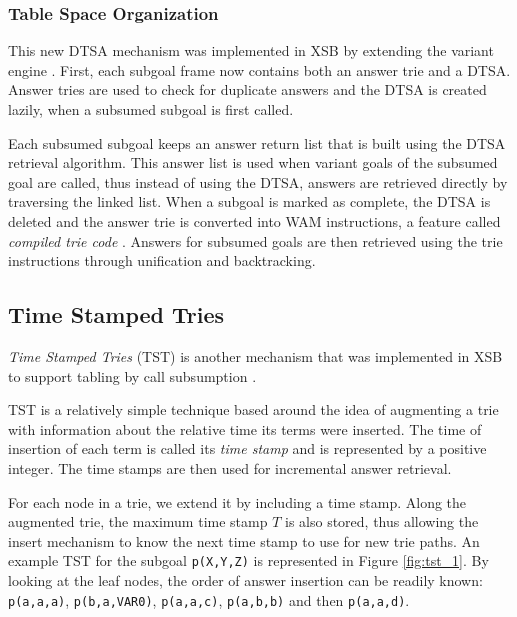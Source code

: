 \subsubsection{Table Space Organization}

This new DTSA mechanism was implemented in XSB by extending the variant engine \cite{Rao-96}.
First, each subgoal frame now contains both an answer trie and a DTSA.
Answer tries are used to check for duplicate answers and the DTSA is created lazily, when a
subsumed subgoal is first called.

Each subsumed subgoal keeps an answer return list that is built using the DTSA retrieval algorithm.
This answer list is used when variant goals of the subsumed goal are called, thus instead of using
the DTSA, answers are retrieved directly by traversing the linked list.
When a subgoal is marked as complete, the DTSA is deleted and the answer trie is converted into WAM
instructions, a feature called \textit{compiled trie code} \cite{RamakrishnanIV-99}. Answers for
subsumed goals are then retrieved using the trie instructions through unification and backtracking.

\subsection{Time Stamped Tries} \label{sec:time_stamped_tries}

\textit{Time Stamped Tries} (TST) is another mechanism that was implemented in XSB
to support tabling by call subsumption \cite{Johnson-99}.

TST is a relatively simple technique based around the idea of augmenting a trie with information about the relative time
its terms were inserted. The time of insertion of each term is called its \textit{time stamp} and is represented by a
positive integer. The time stamps are then used for incremental answer retrieval.

For each node in a trie, we extend it by including a time stamp. Along the augmented trie, the maximum time stamp
$T$ is also stored, thus allowing the insert mechanism to know the next time stamp to use for new trie paths.
An example TST for the subgoal \texttt{p(X,Y,Z)} is represented in Figure \ref{fig:tst_1}.
By looking at the leaf nodes, the order of answer insertion
can be readily known: \texttt{p(a,a,a)}, \texttt{p(b,a,VAR0)}, \texttt{p(a,a,c)}, \texttt{p(a,b,b)} and then
\texttt{p(a,a,d)}.


